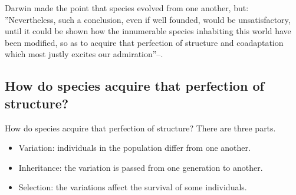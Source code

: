 \documentclass[]{article}
\begin{document}
Darwin made the point that species evolved from one another, but: ''Nevertheless, such a conclusion, even if well founded, would be unsatisfactory, until it could be shown how the innumerable species inhabiting this world have been modified, so as to acquire that perfection of structure and coadaptation which most justly excites our admiration''--\cite{darwin1859origin}.

\subsection{How do species acquire that perfection of structure?}
How do species acquire that perfection of structure? There are three parts.
\begin{itemize}
	\item Variation: individuals in the population differ from one another.
	\item Inheritance: the variation is passed from one generation to another.
	\item Selection: the variations affect the survival of some individuals.
\end{itemize}
\end{document}
